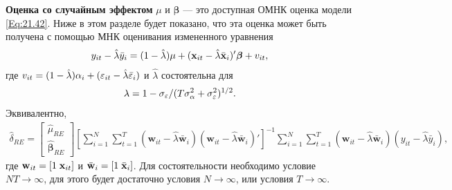 \textbf{Оценка со случайным эффектом} $\mu$ и $\bm\beta$ --- это доступная ОМНК оценка модели \ref{Eq:21.42}. Ниже в этом разделе будет показано, что эта оценка может быть получена с помощью МНК оценивания измененного уравнения
 \begin{align}
y_{it}-\hat{\lambda}\bar{y}_i=(1-\hat{\lambda})\mu+(\mathbf{x}_{it}-\hat{\lambda}\bar{\mathbf{x}}_i)'\bm\beta+v_{it},
\label{Eq:21.43}
\end{align}
где $v_{it}=(1-\hat{\lambda})\alpha_i+(\varepsilon_{it}-\hat{\lambda}\bar{\varepsilon}_i)$ и $\hat{\lambda}$ состоятельна для 
 \begin{align}
\lambda=1-\sigma_\varepsilon/(T\sigma^2_{\alpha}+\sigma^2_\varepsilon)^{1/2}.
\label{Eq:21.44}
\end{align}
Эквивалентно,
 \begin{align}
\hat{\delta}_{RE}=
\begin{bmatrix}
 \hat{\mu}_{RE} \\ \hat{\bm\beta}_{RE}
\end{bmatrix}
\left[ \sum^N_{i=1} \sum^T_{t=1} (\mathbf w_{it}  -\hat{\lambda} \bar{\mathbf w}_i)
 (\mathbf w_{it}  -\hat{\lambda} \bar{\mathbf w}_i)' \right]^{-1}
\sum^N_{i=1} \sum^T_{t=1} (\mathbf w_{it}  -\hat{\lambda} \bar{\mathbf w}_i)(y_{it}-\hat{\lambda}\bar{y}_i),
\label{Eq:21.45}
\end{align}
где $\mathbf w_{it}=[1 \; \mathbf{x}_{it}]$ и $\bar{\mathbf w}_i=[1\; \bar{\mathbf{x}}_i]$. Для состоятельности необходимо условие $NT \rightarrow \infty$, для этого будет достаточно условия $N \rightarrow \infty$, или условия $T \rightarrow \infty$.

